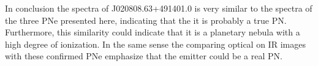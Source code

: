 \documentclass[fleqn,usenatbib]{mnras}
\begin{document}
In conclusion the spectra of J020808.63+491401.0 is very similar to the spectra
of the three PNe presented here, indicating that the it is probably a true PN.
Furthermore, this similarity could indicate that it is a planetary nebula with a
high degree of ionization. In the same sense the comparing optical on IR images
with these confirmed PNe emphasize that the emitter could be a real PN.



\end{document}
